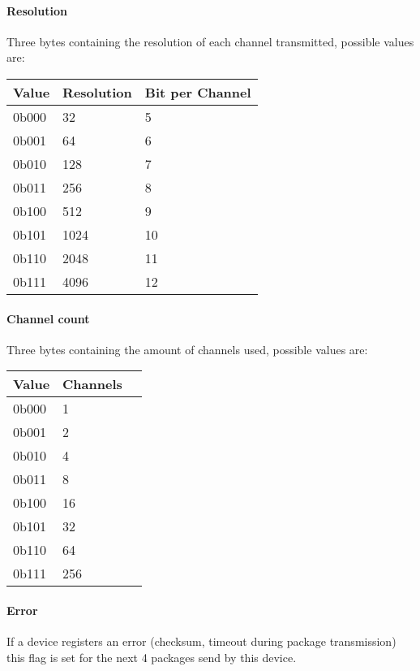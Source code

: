 \documentclass{article}
\begin{document}
    \paragraph{Resolution}
     Three bytes containing the resolution of each channel transmitted, possible
     values are:

     \begin{tabular}{|l|l|l|}
       \hline
       Value & Resolution &	Bit per Channel \\ \hline
       0b000 & 32 & 5 \\ \hline
       0b001 & 64 & 6 \\ \hline
       0b010 & 128 & 7 \\ \hline
       0b011 & 256 & 8 \\ \hline
       0b100 & 512 & 9 \\ \hline
       0b101 & 1024 & 10 \\ \hline
       0b110 & 2048 & 11\\ \hline
       0b111 & 4096 & 12 \\
       \hline
     \end{tabular}

    \paragraph{Channel count}
     Three bytes containing the amount of channels used, possible values are:

     \begin{tabular}{|l|l|l|}
       \hline
       Value & Channels \\ \hline
       0b000 & 1 \\ \hline
       0b001 & 2 \\ \hline
       0b010 & 4 \\ \hline
       0b011 & 8 \\ \hline
       0b100 & 16 \\ \hline
       0b101 & 32 \\ \hline
       0b110 & 64 \\ \hline
       0b111 & 256 \\
       \hline
     \end{tabular}

    \paragraph{Error}
     If a device registers an error (checksum, timeout during package
     transmission) this flag is set for the next 4 packages send by this device.
\end{document}
